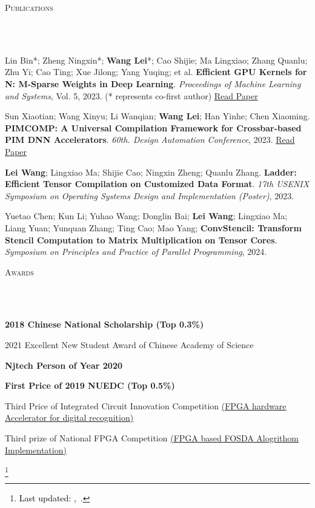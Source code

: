 \documentclass{article}
\newcommand\blfootnote[1]{%
  \begingroup
  \renewcommand\thefootnote{}\footnote{#1}%
  \addtocounter{footnote}{-1}%
  \endgroup
}
\newcommand{\header}[1]{{
\hspace*{-15pt}\vspace*{6pt} \textsc{#1}} \vspace*{-6pt} 
\lineunder
}
\newcommand{\lineunder}{
\vspace*{-8pt} \\ \hspace*{-18pt} 
\hrulefill \\
}
\renewcommand{\labelitemii}{
$\vcenter{\hbox{\tiny$\bullet$}}$\hspace*{-3pt}
}
\newcommand{\myhref}[2]{%
\href{#1}{\textcolor{ColorTwo}{#2}}
}
\newenvironment{bullet-list-major}{
\begin{list}{\labelitemii}{\setlength\leftmargin{3pt} 
\topsep 0pt \itemsep -2pt}}{\vspace*{4pt}\end{list}
}
\begin{document}
\vspace*{4pt}%
\header{Publications}
    \begin{bullet-list-major}
    \item Lin Bin*; Zheng Ningxin*; \textbf{Wang Lei}*; Cao Shijie; Ma Lingxiao; Zhang Quanlu; Zhu Yi; Cao Ting; Xue Jilong; Yang Yuqing; et al. \textbf{Efficient GPU Kernels for N: M-Sparse Weights in Deep Learning}. \textit{Proceedings of Machine Learning and Systems}, Vol. 5, 2023. (* represents co-first author) \hspace{2pt} \textcolor{ColorTwo}{\faLink}  \myhref{https://proceedings.mlsys.org/paper_files/paper/2023/file/4552cedd396a308320209f75f56a5ad5-Paper-mlsys2023.pdf}{Read Paper}
    \vspace{2pt}
    \item Sun Xiaotian; Wang Xinyu; Li Wanqian; \textbf{Wang Lei}; Han Yinhe; Chen Xiaoming. \textbf{PIMCOMP: A Universal Compilation Framework for Crossbar-based PIM DNN Accelerators}. \textit{60th. Design Automation Conference}, 2023.    \textcolor{ColorTwo}{\faLink}  \myhref{https://arxiv.org/pdf/2307.01475.pdf}{Read Paper}
    \vspace{2pt}
    \item \textbf{Lei Wang}; Lingxiao Ma; Shijie Cao; Ningxin Zheng; Quanlu Zhang. \textbf{Ladder: Efficient Tensor Compilation on Customized Data Format}. \textit{17th USENIX Symposium on Operating Systems Design and Implementation (Poster)}, 2023.
    \item Yuetao Chen; Kun Li; Yuhao Wang; Donglin Bai; \textbf{Lei Wang}; Lingxiao Ma; Liang Yuan; Yunquan Zhang; Ting Cao; Mao Yang; \textbf{ConvStencil: Transform Stencil Computation to Matrix
                    Multiplication on Tensor Cores}. \textit{Symposium on Principles and Practice of Parallel Programming}, 2024.
    \end{bullet-list-major}

\vspace*{4pt}%
\header{Awards}
\begin{bullet-list-major}
    \item \textbf{2018 Chinese National Scholarship (Top 0.3\%)}
    \vspace{2pt}
    \item 2021 Excellent New Student Award of Chinese Academy of Science
    \vspace{2pt}
    \item \textbf{Njtech \textbf{Person of Year 2020}}
    \vspace{2pt}
    \item \textbf{First Price of 2019 NUEDC (Top 0.5\%)}
    \vspace{2pt}
    \item Third Price of Integrated Circuit Innovation Competition \href{http://leiblog.wang/FPGA车牌识别/}{(FPGA hardware Accelerator for digital recognition)}
    \vspace{2pt}
    \item Third prize of National FPGA Competition \href{http://leiblog.wang/ZYNQ声源定位波束形成/}{(FPGA based FOSDA Alogrithom Implementation)}
\end{bullet-list-major}

\blfootnote{
\textcolor{black}{Last updated: \monthname,~\the\year.} \vspace{1mm}
}
\end{document}
